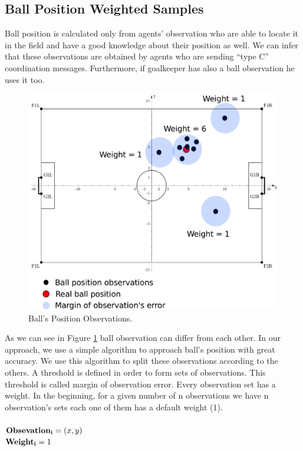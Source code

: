 \subsection{Ball Position Weighted Samples}
Ball position is calculated only from agents' observation who are able to locate it in the field and have a good knowledge about their position as well. We can infer that these observations are obtained by agents who are sending ``type C'' coordination messages. Furthermore, if goalkeeper has also a ball observation he uses it too.
\begin{figure}[htb!]
\centering
  \includegraphics[scale=0.5]{Chapter4/figures/Ball.pdf}
  \caption{Ball's Position Observations.} 
  \label{fig:Ball}
\end{figure}
As we can see in Figure \ref{fig:Ball} ball observation can differ from each other. In our approach, we use a simple algorithm to approach ball's position with great accuracy. We use this algorithm to split these observations according to the others. A threshold is defined in order to form sets of observations. This threshold is called margin of observation error. Every observation set has a weight. In the beginning, for a given number of n observations we have n observation's sets each one of them has a default weight (1).\\
\\
${\bf Obsevation_{i} } = (x,y)$\\
${\bf Weight_{i}} = 1$\\
\\
